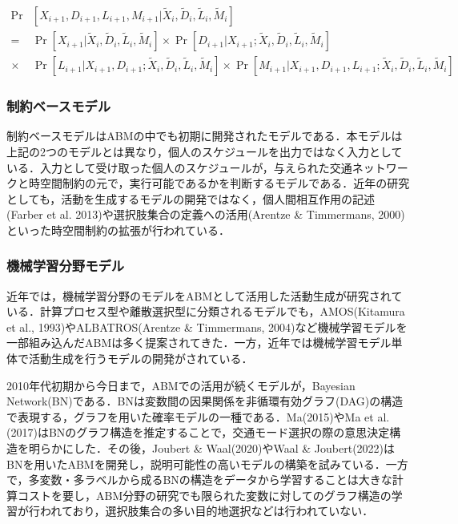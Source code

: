 \begin{equation} \label{eq2_5}
	\begin{split}
		\Pr&[X_{i+1}, D_{i+1}, L_{i+1}, M_{i+1} | \tilde{X}_{i}, \tilde{D}_{i}, \tilde{L}_{i}, \tilde{M}_{i}] \\
		= &\Pr[X_{i+1} | \tilde{X}_{i}, \tilde{D}_{i}, \tilde{L}_{i}, \tilde{M}_{i}] \times  \Pr[D_{i+1} | X_{i+1}; \tilde{X}_{i}, \tilde{D}_{i}, \tilde{L}_{i}, \tilde{M}_{i}] \\
		\times &\Pr[L_{i+1} | X_{i+1}, D_{i+1}; \tilde{X}_{i}, \tilde{D}_{i}, \tilde{L}_{i}, \tilde{M}_{i}] \times \Pr[M_{i+1} | X_{i+1}, D_{i+1}, L_{i+1}; \tilde{X}_{i}, \tilde{D}_{i}, \tilde{L}_{i}, \tilde{M}_{i}]
	\end{split}
\end{equation}


\subsubsection{制約ベースモデル}

制約ベースモデルはABMの中でも初期に開発されたモデルである．本モデルは上記の2つのモデルとは異なり，個人のスケジュールを出力ではなく入力としている．入力として受け取った個人のスケジュールが，与えられた交通ネットワークと時空間制約の元で，実行可能であるかを判断するモデルである．近年の研究としても，活動を生成するモデルの開発ではなく，個人間相互作用の記述(Farber et al. 2013)や選択肢集合の定義への活用(Arentze \& Timmermans, 2000)といった時空間制約の拡張が行われている．

\subsubsection{機械学習分野モデル}

近年では，機械学習分野のモデルをABMとして活用した活動生成が研究されている．計算プロセス型や離散選択型に分類されるモデルでも，AMOS(Kitamura et al., 1993)やALBATROS(Arentze \& Timmermans, 2004)など機械学習モデルを一部組み込んだABMは多く提案されてきた．一方，近年では機械学習モデル単体で活動生成を行うモデルの開発がされている．

2010年代初期から今日まで，ABMでの活用が続くモデルが，Bayesian Network(BN)である．BNは変数間の因果関係を非循環有効グラフ(DAG)の構造で表現する，グラフを用いた確率モデルの一種である．Ma(2015)やMa et al.(2017)はBNのグラフ構造を推定することで，交通モード選択の際の意思決定構造を明らかにした．その後，Joubert \& Waal(2020)やWaal \& Joubert(2022)はBNを用いたABMを開発し，説明可能性の高いモデルの構築を試みている．一方で，多変数・多ラベルから成るBNの構造をデータから学習することは大きな計算コストを要し，ABM分野の研究でも限られた変数に対してのグラフ構造の学習が行われており，選択肢集合の多い目的地選択などは行われていない．

